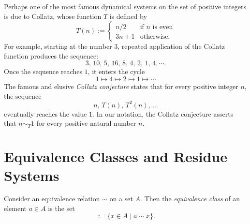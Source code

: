Perhaps one of the most famous dynamical systems on the set of positive integers is due to Collatz, whose function $T$ is defined by
\begin{equation*}
  T(n) :=
  \begin{cases}
    n/2 & \text{if $n$ is even} \\
    3n+1 & \text{otherwise.}
  \end{cases}
\end{equation*}
For example, starting at the number $3$, repeated application of the Collatz function produces the sequence:
\begin{equation*}
  3,\,10,\,5,\,16,\,8,\,4,\,2,\,1,\,4,\cdots.
\end{equation*}
Once the sequence reaches $1$, it enters the cycle
\begin{equation*}
  1\mapsto 4\mapsto 2\mapsto 1\mapsto \cdots
\end{equation*}
The famous and elusive \emph{Collatz conjecture} states that for every positive integer $n$, the sequence
\begin{equation*}
  n,\,T(n),\,T^2(n),\,\ldots
\end{equation*}
eventually reaches the value $1$. In our notation, the Collatz conjecture asserts that $n\sim_T 1$ for every positive natural number $n$.

\section{Equivalence Classes and Residue Systems}

\begin{definition}
  Consider an equivalence relation $\sim$ on a set $A$. Then the \emph{equivalence class} of an element $a\in A$ is the set
  \begin{equation*}
    [a] := \{x\in A \mid a \sim x\}.
  \end{equation*}
\end{definition}

